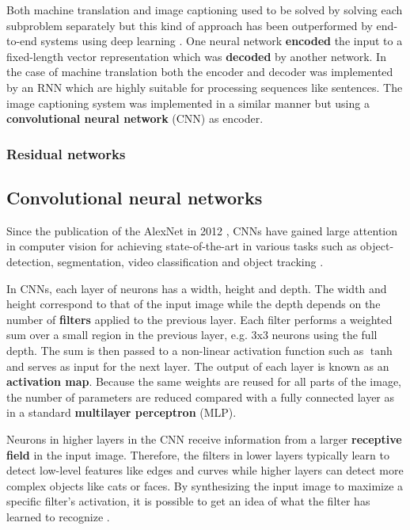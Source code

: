 Both machine translation and image captioning used to be solved by solving each subproblem separately but this kind of approach has been outperformed by end-to-end systems using deep learning \cite{ShowAndTell}. One neural network \textbf{encoded} the input to a fixed-length vector representation which was \textbf{decoded} by another network. In the case of machine translation both the encoder and decoder was implemented by an RNN which are highly suitable for processing sequences like sentences. The image captioning system was implemented in a similar manner but using a \textbf{convolutional neural network} (CNN) as encoder.

\subsubsection{Residual networks}


\subsection{Convolutional neural networks}

Since the publication of the AlexNet in 2012 \cite{AlexNet}, CNNs have gained large attention in computer vision for achieving state-of-the-art in various tasks such as object-detection, segmentation, video classification and object tracking \cite{InceptionV3}.


In CNNs, each layer of neurons has a width, height and depth. The width and height correspond to that of the input image while the depth depends on the number of \textbf{filters} applied to the previous layer.
Each filter performs a weighted sum over a small region in the previous layer, e.g. 3x3 neurons using the full depth. The sum is then passed to a non-linear activation function such as $\tanh$ and serves as input for the next layer. The output of each layer is known as an \textbf{activation map}.
Because the same weights are reused for all parts of the image, the number of parameters are reduced compared with a fully connected layer as in a standard \textbf{multilayer perceptron} (MLP).

Neurons in higher layers in the CNN receive information from a larger \textbf{receptive field} in the input image. Therefore, the filters in lower layers typically learn to detect low-level features like edges and curves while higher layers can detect more complex objects like cats or faces.
By synthesizing the input image to maximize a specific filter's activation, it is possible to get an idea of what the filter has learned to recognize \cite{VisualizeCnn}.

